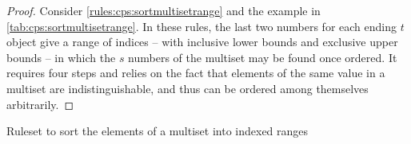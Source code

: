 \begin{proof}
Consider \cref{rules:cps:sortmultisetrange} and the example in \cref{tab:cps:sortmultisetrange}.  In these rules, the last two numbers for each ending \(t\) object give a range of indices -- with inclusive lower bounds and exclusive upper bounds -- in which the \(s\) numbers of the multiset may be found once ordered.  It requires four steps and relies on the fact that elements of the same value in a multiset are indistinguishable, and thus can be ordered among themselves arbitrarily.

\end{proof}

\begin{cprulesetfloat} \begin{cpruleset}





\end{cpruleset}
\caption{\label{rules:cps:sortmultisetrange}Ruleset to sort the elements of a multiset into indexed ranges}
\end{cprulesetfloat}

